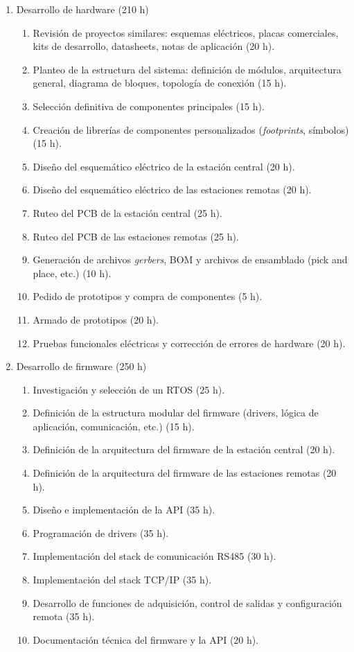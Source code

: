 \documentclass[
11pt, %
]{charter}
\begin{document}
\begin{enumerate}
	\item Desarrollo de hardware (210 h)
	\begin{enumerate}
		\item Revisión de proyectos similares: esquemas eléctricos, placas comerciales, kits de desarrollo, datasheets, notas de aplicación (20 h).
		\item Planteo de la estructura del sistema: definición de módulos, arquitectura general, diagrama de bloques, topología de conexión (15 h).
		\item Selección definitiva de componentes principales (15 h).
		\item Creación de librerías de componentes personalizados (\textit{footprints}, símbolos) (15 h).
		\item Diseño del esquemático eléctrico de la estación central (20 h).
		\item Diseño del esquemático eléctrico de las estaciones remotas (20 h).
		\item Ruteo del PCB de la estación central (25 h).
		\item Ruteo del PCB de las estaciones remotas (25 h).
		\item Generación de archivos \textit{gerbers}, BOM y archivos de ensamblado (pick and place, etc.) (10 h).
		\item Pedido de prototipos y compra de componentes (5 h).
		\item Armado de prototipos (20 h).
		\item Pruebas funcionales eléctricas y corrección de errores de hardware (20 h).
	\end{enumerate}
	\newpage
	\item Desarrollo de firmware (250 h)
	\begin{enumerate}
		\item Investigación y selección de un RTOS (25 h).
		\item Definición de la estructura modular del firmware (drivers, lógica de aplicación, comunicación, etc.) (15 h).
		\item Definición de la arquitectura del firmware de la estación central (20 h).
		\item Definición de la arquitectura del firmware de las estaciones remotas (20 h).
		\item Diseño e implementación de la API (35 h).
		\item Programación de drivers (35 h).
		\item Implementación del stack de comunicación RS485 (30 h).
		\item Implementación del stack TCP/IP (35 h).
		\item Desarrollo de funciones de adquisición, control de salidas y configuración remota (35 h).
		\item Documentación técnica del firmware y la API (20 h).
	\end{enumerate}
	

\end{enumerate}
\end{document}
